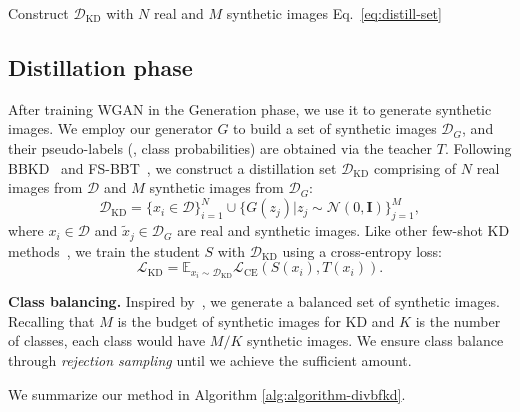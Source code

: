 \begin{algorithm}[ht]
  \vspace{0.5\baselineskip}
  Construct $\mathcal{D}_\text{KD}$ with $N$ real and $M$ synthetic images \hfill Eq.~\ref{eq:distill-set} \\

  \vspace{0.5\baselineskip}
\end{algorithm}

\subsection{Distillation phase}
\begin{foldable}
  After training WGAN in the Generation phase, we use it to generate synthetic images.
  We employ our generator $G$ to build a set of synthetic images $\mathcal{D}_G$, and their pseudo-labels (\ie, class probabilities) are obtained via the teacher $T$.
  Following BBKD~\cite{wang2020neural} and FS-BBT~\cite{nguyen2022black}, we construct a distillation set $\mathcal{D}_\text{KD}$ comprising of $N$ real images from $\mathcal{D}$ and $M$ synthetic images from $\mathcal{D}_G$:
  \begin{equation}
    \mathcal{D}_\text{KD} = {
      \{x_{i} \in \mathcal{D}\}_{i=1}^{N} \cup
      \{G(z_{j}) | z_{j} \sim \mathcal{N}(0, \mathbf{I})\}_{j=1}^{M}
    },
    \label{eq:distill-set}
  \end{equation}
  where $x_{i} \in \mathcal{D}$ and $\tilde{x}_{j} \in \mathcal{D}_G$ are real and synthetic images.
  Like other few-shot KD methods~\cite{wang2020neural,nguyen2022black}, we train the student $S$ with $\mathcal{D}_\text{KD}$ using a cross-entropy loss:
  \begin{equation}
    \mathcal{L}_\text{KD} = \mathbb{E}_{x_{i} \sim \mathcal{D}_\text{KD}} \mathcal{L}_\text{CE}(S(x_{i}), T(x_{i})).
    \label{eq:loss-S}
  \end{equation}
\end{foldable}

\begin{foldable}
  \textbf{Class balancing.} Inspired by~\cite{chen2019data,zhang2022ideal}, we generate a balanced set of synthetic images.
  Recalling that $M$ is the budget of synthetic images for KD and $K$ is the number of classes, each class would have $M / K$ synthetic images.
  We ensure class balance through \textit{rejection sampling} until we achieve the sufficient amount.
\end{foldable}

We summarize our method in Algorithm \ref{alg:algorithm-divbfkd}.
